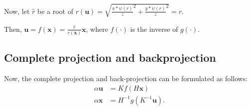 Now, let \(\widehat{r}\) be a root of
\(r(\mathbf{u})
= \sqrt{
	\frac{x * \psi \left( r\right)}{z}^{2} +
	\frac{y * \psi \left( r\right)}{z}^{2}
} = r\).

Then, \(\mathbf{u} = f(\mathbf{x}) =
\frac{\widehat{r}}{r(\mathbf{x})}\mathbf{x}\),
where \(f(\cdot)\) is the inverse of \(g(\cdot)\).

\subsection{Complete projection and backprojection}\label{sub:complete_projection_and_backprojection}

Now, the complete projection and back-projection can be formulated as follows:
\begin{align}
	\alpha \mathbf{u} & = K f(H\mathbf{x})
	\tag{Projection} \label{eq:projection}                     \\
	\alpha \mathbf{x} & = H^{-1} g(K^{-1}\mathbf{u}) \tag{Back
		projection} \label{eq:back_projection}.
\end{align}

